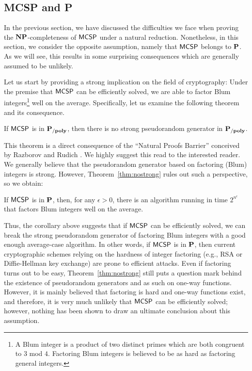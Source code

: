 \documentclass[11pt]{article}
\begin{document}
\subsection{MCSP and P}
\label{subsect:MCSP-P}
In the previous section, we have discussed the difficulties we face when proving
the $\NP$-completeness of $\mathprob{MCSP}$ under a natural reduction.
Nonetheless, in this section, we consider the opposite assumption, namely that $\mathprob{MCSP}$ belongs to $\P$. As we will see, this
results in some surprising consequences which are generally assumed
to be unlikely.

Let us start by providing a strong implication on the field of cryptography:
Under the premise that
$\mathprob{MCSP}$ can be efficiently solved, we are able to factor Blum
integers\footnote{A Blum integer is a product of two distinct primes which are both congruent to $3$ mod $4$. Factoring Blum integers is believed to be as hard as factoring general integers.}
well on the average.
Specifically, let us examine the following theorem and its consequence.

\begin{theorem}
  \label{thm:nostrong}
	If $\mathprob{MCSP}$ is in $\Ppoly$, then there is no strong pseudorandom
  generator in $\Ppoly$.
\end{theorem}

This theorem is a direct consequence of the ``Natural Proofs Barrier''
conceived by Razborov and Rudich \cite{10.1006/jcss.1997.1494}.
We highly suggest this read to the interested reader.
%
We generally believe that the pseudorandom generator based on factoring (Blum)
integers is strong.
However, Theorem~\ref{thm:nostrong} rules out such a perspective, so we obtain:

\begin{corollary}
	If $\mathprob{MCSP}$ is in $\P$, then, for any $\epsilon > 0$, there is an algorithm running in time $2^{n^{\epsilon}}$ that factors Blum integers well on the average.
\end{corollary}

Thus, the corollary above suggests that if $\mathprob{MCSP}$ can be efficiently
solved, we can break the strong pseudorandom generator of factoring Blum
integers with a good enough average-case algorithm.
%
In other words, if $\mathprob{MCSP}$ is in $\P$, then current
cryptographic schemes relying on the hardness of integer factoring
(e.g., RSA or Diffie-Hellman key exchange) are prone to efficient
attacks.
%
Even if factoring turns out to be easy, Theorem~\ref{thm:nostrong} still puts a
question mark behind the existence of pseudorandom generators and as such
on one-way functions.
%
However,
it is mainly believed that factoring is hard
and one-way functions exist,
and therefore, it is very much unlikely that $\mathprob{MCSP}$ can be efficiently
solved; however, nothing has been shown to draw an ultimate conclusion about
this assumption.
\end{document}
